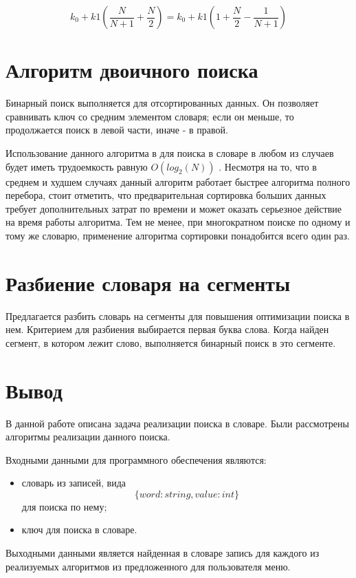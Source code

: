 \begin{equation}
	k_0 + k1(\frac{N}{N + 1} + \frac{N}{2}) = k_0 + k1(1 + \frac{N}{2} - \frac{1}{N + 1}) 
\end{equation}

\section{Алгоритм двоичного поиска}
Бинарный поиск выполняется для отсортированных данных. Он позволяет сравнивать ключ со средним элементом словаря; если он меньше, то продолжается поиск в левой части, иначе - в правой.

Использование данного алгоритма в для поиска в словаре в любом из случаев будет иметь трудоемкость равную $O(log_2(N))$ \cite{knut}. Несмотря на то, что в среднем и худшем случаях данный алгоритм работает быстрее алгоритма полного перебора, стоит отметить, что предварительная сортировка больших данных требует дополнительных затрат по времени и может оказать серьезное действие на время работы алгоритма. Тем не менее, при многократном поиске по одному и тому же словарю, применение алгоритма сортировки понадобится всего один раз.

\section{Разбиение словаря на сегменты}
Предлагается разбить словарь на сегменты для повышения оптимизации поиска в нем. Критерием для разбиения выбирается первая буква слова. Когда найден сегмент, в котором лежит слово, выполняется бинарный поиск в это сегменте.

\section{Вывод}
В данной работе описана задача реализации поиска в словаре. Были рассмотрены алгоритмы реализации данного поиска.

Входными данными для программного обеспечения являются:
\begin{itemize}
	\item словарь из записей, вида \[\{word: string, value: int\}\] для поиска по нему;
	\item ключ для поиска в словаре.
\end{itemize}

Выходными данными является найденная в словаре запись для каждого из реализуемых алгоритмов из предложенного для пользователя меню.